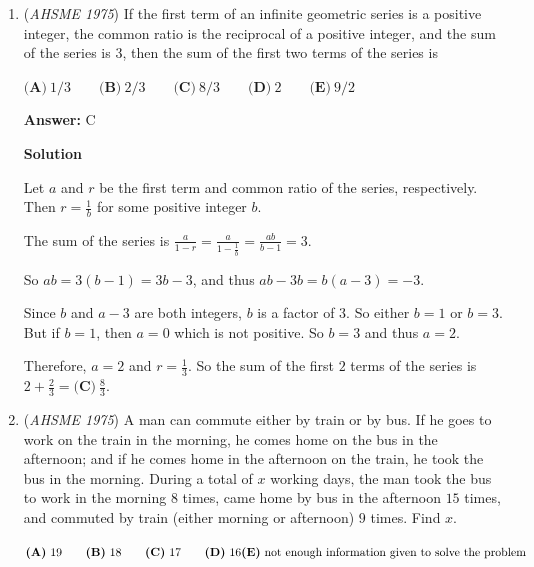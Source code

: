 \begin{enumerate}
First, write a few terms of the sequence:$1, 3, 2, -1, -3, -2, 1, 3, 2, \ldots$  Notice how the pattern repeats every six terms and every six terms have a sum of 0. Then, find that the $16*6=96$th term is $-2$ and the sum of the all those previous terms is $0$. Then, write the 97th to the 100th terms down: $1, 3, 2,-1$ and add them up to get the sum of $\boxed{\textbf{(A) } 5}$



	\item (\textit{AHSME 1975}) If the first term of an infinite geometric series is a positive integer, the common ratio is the reciprocal of a positive integer, 
and the sum of the series is $3$, then the sum of the first two terms of the series is 


 $\textbf{(A)}\ 1/3 \qquad  \textbf{(B)}\ 2/3 \qquad  \textbf{(C)}\ 8/3 \qquad  \textbf{(D)}\ 2 \qquad  \textbf{(E)}\ 9/2$

 \textbf{Answer: }C



\textbf{Solution}

Let $a$ and $r$ be the first term and common ratio of the series, respectively.  Then $r = \frac{1}{b}$ for some positive integer $b$.

 The sum of the series is $\frac{a}{1-r} = \frac{a}{1-\frac{1}{b}} = \frac{ab}{b-1} = 3$.

 So $ab = 3(b-1) = 3b - 3$, and thus $ab - 3b = b(a-3) = -3$.

 Since $b$ and $a-3$ are both integers, $b$ is a factor of $3$.  So either $b = 1$ or $b = 3$.  But if $b = 1$, then $a = 0$ which is not positive.  So $b = 3$ and thus $a = 2$.

 Therefore, $a = 2$ and $r = \frac{1}{3}$.  So the sum of the first $2$ terms of the series is $2 + \frac{2}{3} = \boxed{\textbf{(C)}\ \frac{8}{3}}$.

 


	\item (\textit{AHSME 1975}) A man can commute either by train or by bus. If he goes to work on the train in the morning, 
he comes home on the bus in the afternoon; and if he comes home in the afternoon on the train, 
he took the bus in the morning. During a total of $x$ working days, the man took the bus to work 
in the morning $8$ times, came home by bus in the afternoon $15$ times, and commuted by train 
(either morning or afternoon) $9$ times. Find $x$. 


 $\textbf{(A)}\ 19 \qquad  \textbf{(B)}\ 18 \qquad  \textbf{(C)}\ 17 \qquad  \textbf{(D)}\ 16 \qquad \\ \textbf{(E)}\ \text{not enough information given to solve the problem}$


\end{enumerate}
